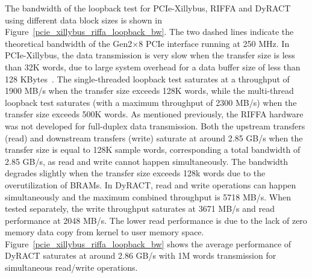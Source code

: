 The bandwidth of the loopback test for PCIe-Xillybus, RIFFA and DyRACT using different data block sizes is shown in Figure~\ref{pcie_xillybus_riffa_loopback_bw}. 
The two dashed lines indicate the theoretical bandwidth of the Gen2$\times$8 PCIe interface running at 250 MHz.
In PCIe-Xillybus, the data transmission is very slow when the transfer size is less than 32K words, due to large system overhead for a data buffer size of less than 128 KBytes~\cite{xillybus2018}. 
The single-threaded loopback test saturates at a throughput of 1900 MB/s when the transfer size exceeds 128K words, while the multi-thread loopback test saturates (with a maximum throughput of 2300 MB/s) when the transfer size exceeds 500K words. 
As mentioned previously, the RIFFA hardware was not developed for full-duplex data transmission. 
Both the upstream transfers (read) and downstream transfers (write) saturate at around 2.85 GB/s when the transfer size is equal to 128K sample words, corresponding a total bandwidth of 2.85 GB/s, as read and write cannot happen simultaneously. 
The bandwidth degrades slightly when the transfer size exceeds 128k words due to the overutilization of BRAMs.
In DyRACT, read and write operations can happen simultaneously and the maximum combined throughput is 5718 MB/s. 
When tested separately, the write throughput saturates at 3671 MB/s and read performance at 2048 MB/s.
The lower read performance is due to the lack of zero memory data copy from kernel to user memory space.
Figure~\ref{pcie_xillybus_riffa_loopback_bw} shows the average performance of DyRACT saturates at around 2.86 GB/s with 1M words transmission for simultaneous read/write operations.





